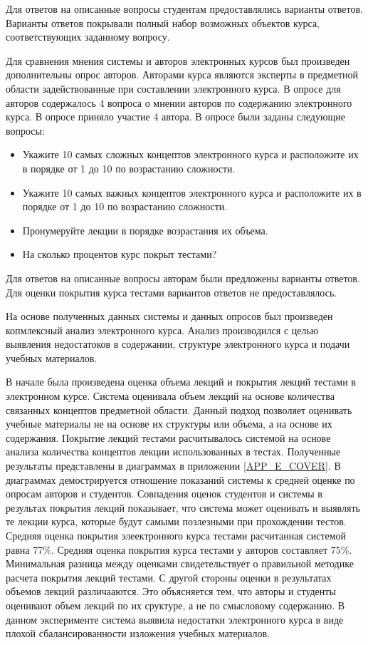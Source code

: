 Для ответов на описанные вопросы студентам предоставлялись варианты ответов. Варианты ответов покрывали полный набор возможных объектов курса, соответствующих заданному вопросу.

Для сравнения мнения системы и авторов электронных курсов был произведен дополнительны опрос авторов. Авторами курса являются эксперты в предметной области задействованные при составлении электронного курса. В опросе для авторов содержалось 4 вопроса о мнении авторов по содержанию электронного курса. В опросе приняло участие 4 автора. В опросе были заданы следующие вопросы:

\begin{itemize}
\item Укажите 10 самых сложных концептов электронного курса и расположите их в порядке от 1 до 10 по возрастанию сложности.
\item Укажите 10 самых важных концептов электронного курса и расположите их в порядке от 1 до 10 по возрастанию сложности.
\item Пронумеруйте лекции в порядке возрастания их объема. 
\item На сколько процентов курс покрыт тестами?
\end{itemize}

Для ответов на описанные вопросы авторам были предложены варианты ответов. Для оценки покрытия курса тестами вариантов ответов не предоставлялось. 

На основе полученных данных системы и данных опросов был произведен копмлексный анализ электронного курса. Анализ производился с целью выявления недостатоков в содержании, структуре электронного курса и подачи учебных материалов.

В начале была произведена оценка объема лекций и покрытия лекций тестами в электронном курсе. Система оценивала объем лекций на основе количества связанных концептов предметной области. Данный подход позволяет оценивать учебные материалы не на основе их структуры или объема, а на основе их содержания. Покрытие лекций тестами расчитывалось системой на основе анализа количества концептов лекции использованных в тестах. Полученные результаты представлены в диаграммах в приложении \ref{APP_E_COVER}. В диаграммах демострируется отношение показаний системы к средней оценке по опросам авторов и студентов. Совпадения оценок студентов и системы в результах покрытия лекций показывает, что система может оценивать и выявлять те лекции курса, которые будут самыми позлезными при прохождении тестов. Средняя оценка покрытия элеектронного курса тестами расчитанная системой равна 77\%. Средняя оценка покрытия курса тестами у авторов составляет 75\%. Минимальная разница между оценками свидетельствует о правильной методике расчета покрытия лекций тестами. С другой стороны оценки в результатах объемов лекций различааются. Это объясняется тем, что авторы и студенты оценивают объем лекций по их сруктуре, а не по смысловому содержанию. В данном эксперименте система выявила недостатки электронного курса в виде плохой сбалансированности изложения учебных материалов.      


